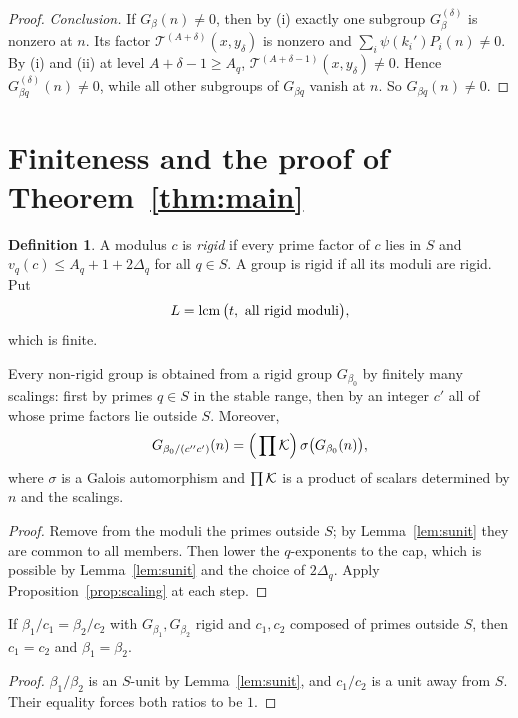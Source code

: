 \documentclass[11pt]{amsart}
\theoremstyle{definition}\newtheorem{definition}[theorem]{Definition}
\theoremstyle{remark}\newtheorem{remark}[theorem]{Remark}
\begin{document}
\begin{proof}
\emph{Conclusion.} If $G_\beta(n)\neq0$, then by (i) exactly one subgroup $G_\beta^{(\delta)}$ is nonzero at $n$. Its factor $\mathcal T^{(A+\delta)}(x,y_\delta)$ is nonzero and $\sum_i\psi(k_i')P_i(n)\neq0$. By (i) and (ii) at level $A+\delta-1\ge A_q$, $\mathcal T^{(A+\delta-1)}(x,y_\delta)\neq0$. Hence $G_{\beta q}^{(\delta)}(n)\neq0$, while all other subgroups of $G_{\beta q}$ vanish at $n$. So $G_{\beta q}(n)\neq0$.
\end{proof}

\section{Finiteness and the proof of Theorem~\ref{thm:main}}\label{sec:finite}
\begin{definition}
A modulus $c$ is \emph{rigid} if every prime factor of $c$ lies in $S$ and $v_q(c)\le A_q+1+2\Delta_q$ for all $q\in S$. A group is rigid if all its moduli are rigid. Put
\[
L=\operatorname{lcm}\big(t,\ \text{all rigid moduli}\big),
\]
which is finite.
\end{definition}

\begin{lemma}\label{lem:reduce}
Every non-rigid group is obtained from a rigid group $G_{\beta_0}$ by finitely many scalings: first by primes $q\in S$ in the stable range, then by an integer $c'$ all of whose prime factors lie outside $S$. Moreover,
\[
G_{\beta_0/(c''c')}(n)=\Big(\prod\mathcal K\Big)\,\sigma\big(G_{\beta_0}(n)\big),
\]
where $\sigma$ is a Galois automorphism and $\prod\mathcal K$ is a product of scalars determined by $n$ and the scalings.
\end{lemma}
\begin{proof}
Remove from the moduli the primes outside $S$; by Lemma~\ref{lem:sunit} they are common to all members. Then lower the $q$-exponents to the cap, which is possible by Lemma~\ref{lem:sunit} and the choice of $2\Delta_q$. Apply Proposition~\ref{prop:scaling} at each step.
\end{proof}

\begin{lemma}\label{lem:nocollide}
If $\beta_1/c_1=\beta_2/c_2$ with $G_{\beta_1},G_{\beta_2}$ rigid and $c_1,c_2$ composed of primes outside $S$, then $c_1=c_2$ and $\beta_1=\beta_2$.
\end{lemma}
\begin{proof}
$\beta_1/\beta_2$ is an $S$-unit by Lemma~\ref{lem:sunit}, and $c_1/c_2$ is a unit away from $S$. Their equality forces both ratios to be $1$.
\end{proof}
\end{document}
